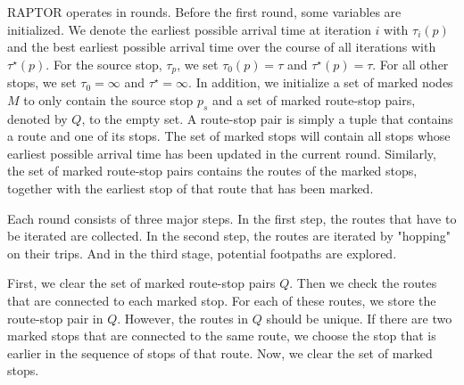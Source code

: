 RAPTOR operates in rounds.
Before the first round, some variables are initialized.
We denote the earliest possible arrival time at iteration \(i\) with \(\tau_i(p)\) and the best earliest possible arrival time over the course of all iterations with \(\tau^\star(p)\).
For the source stop, \(\tau_p\), we set \(\tau_0(p) =\tau\) and \(\tau^\star(p) = \tau\).
For all other stops, we set \(\tau_0 = \infty\) and \(\tau^\star = \infty\).
In addition, we initialize a set of marked nodes \(M\) to only contain the source stop \(p_s\) and a set of marked route-stop pairs, denoted by \(Q\), to the empty set.
A route-stop pair is simply a tuple that contains a route and one of its stops.
The set of marked stops will contain all stops whose earliest possible arrival time has been updated in the current round.
Similarly, the set of marked route-stop pairs contains the routes of the marked stops, together with the earliest stop of that route that has been marked.


Each round consists of three major steps.
In the first step, the routes that have to be iterated are collected.
In the second step, the routes are iterated by "hopping" on their trips.
And in the third stage, potential footpaths are explored.

First, we clear the set of marked route-stop pairs \(Q\).
Then we check the routes that are connected to each marked stop.
For each of these routes, we store the route-stop pair in \(Q\).
However, the routes in \(Q\) should be unique.
If there are two marked stops that are connected to the same route, we choose the stop that is earlier in the sequence of stops of that route.
Now, we clear the set of marked stops.

